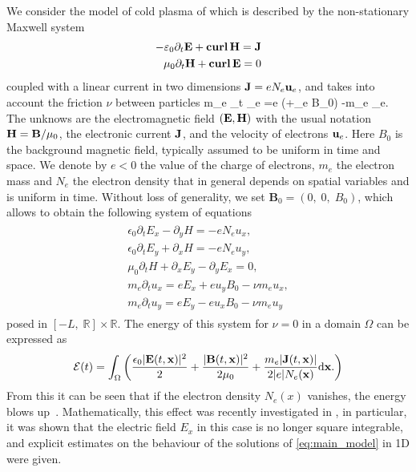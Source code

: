 We consider the model of cold plasma of \cite{Stix} which is described by the non-stationary Maxwell system  
\begin{align}
-\varepsilon_0 \partial_t {\bf E} + {\bf curl}\, {\bf H} = {\bf J}\\
\mu_0 \partial_t {\bf H} + {\bf curl}\, {\bf E} = 0
\end{align}
coupled with a linear current in two dimensions ${\bf J} = eN_e {\bf u}_e$, and takes into account the friction  $\nu$ between particles
\be
m_e \partial_t \ubf_e =e (\E +\ubf_e \nabla B_0) -m_e \nu \ubf_e. \label{eq:electronmove}
\ee
The unknows are the electromagnetic field $({\bf E},{\bf H})$ with the usual notation ${\bf H} = {\bf B}/\mu_0$, 
the electronic current ${\bf J}$, 
and the velocity of electrons ${\bf u}_e$. Here $B_0$ is the background magnetic field, typically assumed to be uniform in time and space.  
We denote by $e<0$ the value of the charge of electrons, $m_e$ the electron mass and $N_e$ the electron density that in general 
depends on spatial variables and is uniform in time. 
Without loss of generality, we set $\mathbf{B}_0=\left(0,\; 0,\; B_0\right)$, which allows to obtain the following system of equations 
\begin{align}
\label{eq:main_model}
\begin{split}
\epsilon_0\partial_t E_{x}-\partial_y H=-eN_e u_x,\\
\epsilon_0\partial_t E_{y}+\partial_x H=-eN_e u_y,\\
\mu_0\partial_t H+\partial_x E_y-\partial_y E_x=0,\\
m_e\partial_t u_x=eE_x+eu_yB_0-\nu m_e u_x,\\
m_e\partial_t u_y=eE_y-eu_xB_0-\nu m_e u_y
\end{split}
\end{align}
posed in $[-L,\; \mathbb{R}]\times \mathbb{R}$. 
The energy of this system for $\nu=0$ in a domain $\Omega$ can be expressed as \cite{stable_yee_plasma_current}
\begin{align*}
{\mathcal E}(t)= \int_\Omega \left(
\frac{\epsilon_0 |{\bf E}(t,{\bf x})|^2}{2}+\frac{ |{\bf B}(t,{\bf x})|^2}{2\mu_0}+\frac{m_e|{\bf J} (t,{\bf x})|}{2|e|N_e({\bf x})} \mathrm{d}{\bf x}.
\right)
\end{align*}
From this it can be seen that if the electron density $N_e(x)$ vanishes, 
the energy blows up~\cite{stable_yee_plasma_current}. 
Mathematically, this effect was recently investigated in \cite{Despres_2014}, 
in particular, it was shown that the electric field $E_x$ in this case is no longer square 
integrable, and explicit estimates on the behaviour of the solutions of \eqref{eq:main_model} in 1D were given. 

